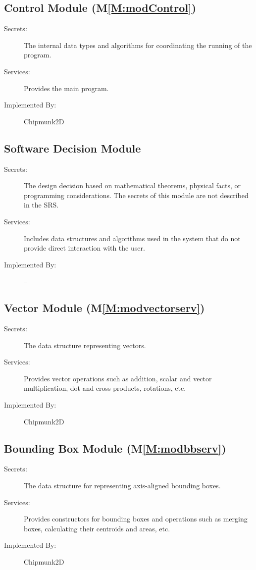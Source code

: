 \documentclass[12pt]{article}
\begin{document}
\subsection{Control Module (M\ref{M:modControl})}
\label{Sec:ContModu()}
\begin{description}
\item[Secrets:]The internal data types and algorithms for coordinating the running of the program.
\item[Services:]Provides the main program.
\item[Implemented By:]Chipmunk2D
\end{description}
\subsection{Software Decision Module}
\label{Sec:SoftDeciModu}
\begin{description}
\item[Secrets:]The design decision based on mathematical theorems, physical facts, or programming considerations. The secrets of this module are not described in the SRS.
\item[Services:]Includes data structures and algorithms used in the system that do not provide direct interaction with the user.
\item[Implemented By:]--
\end{description}
\subsection{Vector Module (M\ref{M:modvectorserv})}
\label{Sec:VectModu()}
\begin{description}
\item[Secrets:]The data structure representing vectors.
\item[Services:]Provides vector operations such as addition, scalar and vector multiplication, dot and cross products, rotations, etc.
\item[Implemented By:]Chipmunk2D
\end{description}
\subsection{Bounding Box Module (M\ref{M:modbbserv})}
\label{Sec:BounBoxModu()}
\begin{description}
\item[Secrets:]The data structure for representing axis-aligned bounding boxes.
\item[Services:]Provides constructors for bounding boxes and operations such as merging boxes, calculating their centroids and areas, etc.
\item[Implemented By:]Chipmunk2D
\end{description}
\end{document}
